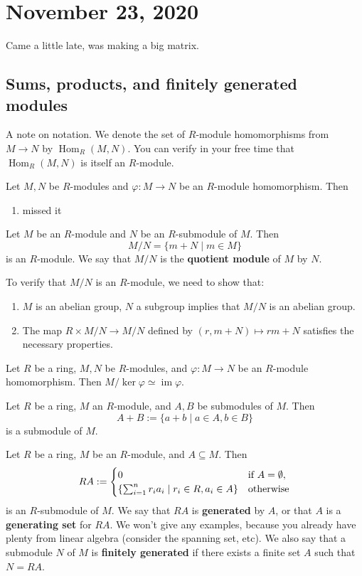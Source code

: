 \section{November 23, 2020}
Came a little late, was making a big matrix.
\subsection{Sums, products, and finitely generated modules}
\begin{note}
    A note on notation. We denote the set of $R$-module homomorphisms from $M\to N$ by $\operatorname{Hom}_R(M,N)$. You can verify in your free time that $\operatorname{Hom}_R(M,N)$ is itself an $R$-module.
\end{note}
\begin{prop}
    Let $M,N$ be $R$-modules and $\varphi \colon M \to N$ be an $R$-module homomorphism. Then 
    \begin{enumerate}
        \item missed it
    \end{enumerate}
\end{prop}
\begin{definition}[]
    Let $M$ be an $R$-module and $N$ be an $R$-submodule of $M$. Then \[
    M /N=\{m+N  \mid m\in M\} 
    \] is an $R$-module. We say that $M /N$ is the \textbf{quotient module} of $M$ by $N$.
\end{definition}
    To verify that $M /N$ is an $R$-module, we need to show that:
    \begin{enumerate}
        \item $M$ is an abelian group, $N$ a subgroup implies that $M /N$ is an abelian group.
        \item The map $R\times M /N \to M /N$ defined by $(r, m+N)\mapsto rm+N$ satisfies the necessary properties.
    \end{enumerate}
\begin{theorem}
    Let $R$ be a ring, $M, N$ be $R$-modules, and $\varphi \colon M \to N$ be an $R$-module homomorphism. Then $M /\ker \varphi \simeq \operatorname{im}\varphi $.
\end{theorem}
\begin{definition}[]
    Let $R$ be a ring, $M$ an $R$-module, and $A,B$ be submodules of $M$. Then \[
    A+B:=\{a+b \mid a\in A,b\in B\} 
    \] is a submodule of $M$.
\end{definition}
\begin{definition}[]
    Let $R$ be a ring, $M$ be an $R$-module, and $A\subseteq M$. Then \[
    RA:=
    \begin{cases}
        0 \quad &\text{if} \ A=\emptyset,\\
        \{\sum_{i=1}^{n} r_i a_i  \mid r_i \in R,a_i \in A\} &\text{otherwise} 
    \end{cases}
\] is an $R$-submodule of $M$. We say that $RA$ is \textbf{generated}  by $A$, or that $A$ is a \textbf{generating set}  for $RA$. We won't give any examples, because you already have plenty from linear algebra (consider the spanning set, etc). We also say that a submodule $N$ of $M$ is \textbf{finitely generated} if there exists a finite set $A$ such that $N=RA$.
\end{definition}
